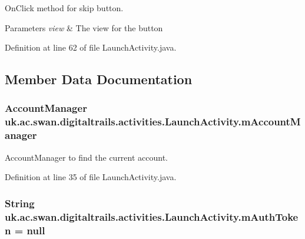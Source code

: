On\+Click method for skip button. 


\begin{DoxyParams}{Parameters}
{\em view} & The view for the button \\
\hline
\end{DoxyParams}


Definition at line 62 of file Launch\+Activity.\+java.



\subsection{Member Data Documentation}
\hypertarget{classuk_1_1ac_1_1swan_1_1digitaltrails_1_1activities_1_1_launch_activity_a22c2b6f53479392c1d9a3e5036149cf0}{
\subsubsection[{m\+Account\+Manager}]{\setlength{\rightskip}{0pt plus 5cm}Account\+Manager uk.\+ac.\+swan.\+digitaltrails.\+activities.\+Launch\+Activity.\+m\+Account\+Manager\hspace{0.3cm}{\ttfamily [private]}}}\label{classuk_1_1ac_1_1swan_1_1digitaltrails_1_1activities_1_1_launch_activity_a22c2b6f53479392c1d9a3e5036149cf0}


Account\+Manager to find the current account. 



Definition at line 35 of file Launch\+Activity.\+java.

\hypertarget{classuk_1_1ac_1_1swan_1_1digitaltrails_1_1activities_1_1_launch_activity_a59bef1ccc5b3cf2d9801d36fd34fea31}{
\subsubsection[{m\+Auth\+Token}]{\setlength{\rightskip}{0pt plus 5cm}String uk.\+ac.\+swan.\+digitaltrails.\+activities.\+Launch\+Activity.\+m\+Auth\+Token = null\hspace{0.3cm}{\ttfamily [private]}}}\label{classuk_1_1ac_1_1swan_1_1digitaltrails_1_1activities_1_1_launch_activity_a59bef1ccc5b3cf2d9801d36fd34fea31}


